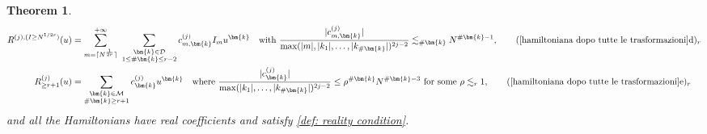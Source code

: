 \documentclass[a4paper,10pt,reqno]{article}
\theoremstyle{definition}
\theoremstyle{plain}
\newtheorem{theorem}[definition]{Theorem}
\theoremstyle{plain}
\theoremstyle{definition}
\theoremstyle{plain}
\theoremstyle{plain}
\theoremstyle{plain}
\theoremstyle{definition}
\theoremstyle{definition}
\def \M{\mathcal{M}}
\def \k{\bm{k}}
\begin{document}
\begin{theorem}
\begin{align}
R^{(j),(I \ge N^{1/2r})}(u) &= \sum_{m = \lceil N^{\frac{1}{2r}} \rceil}^{+\infty} \, \, \sum_{ \substack{ \k \in \mathcal{D} \\ 1 \le \#\k \le r-2} } c_{m,\k}^{(j)} I_m u^{\k} \quad \text{with $\frac{|c_{m,\k}^{(j)}|}{\max ( |m|,|k_1|,\ldots,|k_{\#\k}| )^{2j-2} } \lesssim_{\#\k} N^{\#\k-1}$}, \tag*{(\ref{hamiltoniana dopo tutte le trasformazioni}d)$_r$}\label{azione grande} \\
R_{\ge r+1}^{(j)}(u) &= \sum_{ \substack{ \k \in \M \\ \#\k \ge r+1 } } c_{\k}^{(j)} u^{\k} \quad \text{where $\frac{|c_{\k}^{(j)}|}{\max ( |k_1|,\ldots,|k_{\#\k}| )^{2j-2} } \le \rho^{\#\k} N^{\#\k-3}$ for some $\rho \lesssim_r 1$}, \tag*{(\ref{hamiltoniana dopo tutte le trasformazioni}e)$_r$} \label{resto grande}
\end{align}
and all the Hamiltonians have real coefficients and satisfy \eqref{def: reality condition}.
\end{theorem}
\end{document}
